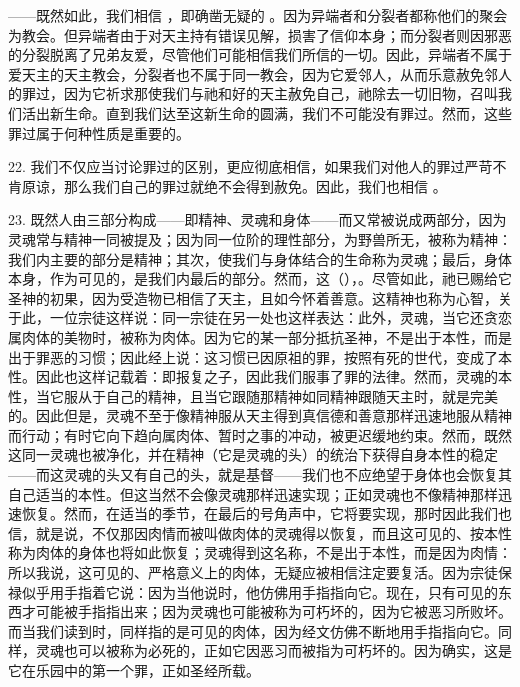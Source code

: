 ——既然如此，我们相信 ，即确凿无疑的 。因为异端者和分裂者都称他们的聚会为教会。但异端者由于对天主持有错误见解，损害了信仰本身；而分裂者则因邪恶的分裂脱离了兄弟友爱，尽管他们可能相信我们所信的一切。因此，异端者不属于爱天主的天主教会，分裂者也不属于同一教会，因为它爱邻人，从而乐意赦免邻人的罪过，因为它祈求那使我们与祂和好的天主赦免自己，祂除去一切旧物，召叫我们活出新生命。直到我们达至这新生命的圆满，我们不可能没有罪过。然而，这些罪过属于何种性质是重要的。\par

22. 我们不仅应当讨论罪过的区别，更应彻底相信，如果我们对他人的罪过严苛不肯原谅，那么我们自己的罪过就绝不会得到赦免。因此，我们也相信 。\par

23. 既然人由三部分构成——即精神、灵魂和身体——而又常被说成两部分，因为灵魂常与精神一同被提及；因为同一位阶的理性部分，为野兽所无，被称为精神：我们内主要的部分是精神；其次，使我们与身体结合的生命称为灵魂；最后，身体本身，作为可见的，是我们内最后的部分。然而，这（），。尽管如此，祂已赐给它圣神的初果，因为受造物已相信了天主，且如今怀着善意。这精神也称为心智，关于此，一位宗徒这样说：同一宗徒在另一处也这样表达：此外，灵魂，当它还贪恋属肉体的美物时，被称为肉体。因为它的某一部分抵抗圣神，不是出于本性，而是出于罪恶的习惯；因此经上说：这习惯已因原祖的罪，按照有死的世代，变成了本性。因此也这样记载着：即报复之子，因此我们服事了罪的法律。然而，灵魂的本性，当它服从于自己的精神，且当它跟随那精神如同精神跟随天主时，就是完美的。因此但是，灵魂不至于像精神服从天主得到真信德和善意那样迅速地服从精神而行动；有时它向下趋向属肉体、暂时之事的冲动，被更迟缓地约束。然而，既然这同一灵魂也被净化，并在精神（它是灵魂的头）的统治下获得自身本性的稳定——而这灵魂的头又有自己的头，就是基督——我们也不应绝望于身体也会恢复其自己适当的本性。但这当然不会像灵魂那样迅速实现；正如灵魂也不像精神那样迅速恢复。然而，在适当的季节，在最后的号角声中，它将要实现，那时因此我们也信，就是说，不仅那因肉情而被叫做肉体的灵魂得以恢复，而且这可见的、按本性称为肉体的身体也将如此恢复；灵魂得到这名称，不是出于本性，而是因为肉情：所以我说，这可见的、严格意义上的肉体，无疑应被相信注定要复活。因为宗徒保禄似乎用手指着它说：因为当他说时，他仿佛用手指指向它。现在，只有可见的东西才可能被手指指出来；因为灵魂也可能被称为可朽坏的，因为它被恶习所败坏。而当我们读到时，同样指的是可见的肉体，因为经文仿佛不断地用手指指向它。同样，灵魂也可以被称为必死的，正如它因恶习而被指为可朽坏的。因为确实，这是它在乐园中的第一个罪，正如圣经所载。\par

